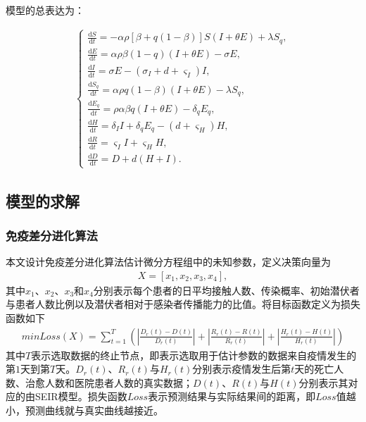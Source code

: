 \documentclass{whutmod}
\begin{document}
			模型的总表达为：
			\begin{spacing}{2.2}
			\begin{gather}
			\left\{\begin{array}{l}
			\frac{\mathrm{d} S}{\mathrm{d} t}=-\alpha\rho [\beta +q(1-\beta)]S(I+\theta E)+\lambda S_{q},
			\\ \frac{\mathrm{d} E}{\mathrm{d} t}=\alpha\rho\beta(1-q) (I+\theta E)-\sigma E,
			\\ \frac{\mathrm{d} I}{\mathrm{d} t}=\sigma E-(\sigma_I+d+\varsigma_I)I,
			\\ \frac{\mathrm{d} S_q}{\mathrm{d} t}=\alpha\rho q(1-\beta)(I+\theta E)-\lambda S_q,
			\\ \frac{\mathrm{d} E_q}{\mathrm{d} t}=\rho \alpha \beta q(I+\theta E)-\delta_q E_q,
			\\ \frac{\mathrm{d}H }{\mathrm{d} t}=\delta_I I+ \delta_q E_q-(d+\varsigma_H )H,
			\\ \frac{\mathrm{d} R}{\mathrm{d} t}=\varsigma_I I+\varsigma_H H,
			\\\frac{\mathrm{d} D}{\mathrm{d} t}= D + d(H+I).
			\end{array}\right.
			\end{gather}
			\end{spacing}
		\subsection{模型的求解}
		\subsubsection{免疫差分进化算法}
		本文设计免疫差分进化算法估计微分方程组中的未知参数，定义决策向量为
		\begin{gather}
		X=[x_1,x_2,x_3,x_4],
		\end{gather}
		其中$x_1$、$x_2$、$x_3$和$x_4$分别表示每个患者的日平均接触人数、传染概率、初始潜伏者与患者人数比例以及潜伏者相对于感染者传播能力的比值。将目标函数定义为损失函数如下
		\begin{gather}
		min Loss(X)=\sum_{t=1}^T (|\frac{D_r(t)-D(t)}{D_r(t)}|+|\frac{R_r(t)-R(t)}{R_r(t)}|+|\frac{H_r(t)-H(t)}{H_r(t)}|)
		\end{gather}
		其中$T$表示选取数据的终止节点，即表示选取用于估计参数的数据来自疫情发生的第$1$天到第$T$天。$D_r(t)$、$R_r(t)$与$H_r(t)$分别表示疫情发生后第$t$天的死亡人数、治愈人数和医院患者人数的真实数据；$D(t)$、$R(t)$与$H(t)$分别表示其对应的由SEIR模型。损失函数$Loss$表示预测结果与实际结果间的距离，即$Loss$值越小，预测曲线就与真实曲线越接近。
\end{document}

